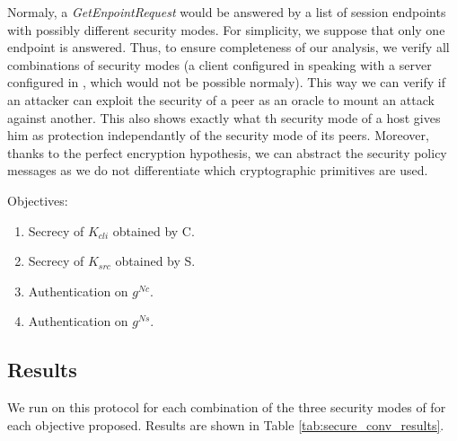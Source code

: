 Normaly, a {\em GetEnpointRequest} would be answered by a list of session
endpoints with possibly different security modes.
For simplicity, we suppose that only one endpoint is answered.
Thus, to ensure completeness of our analysis, we verify all combinations of
security modes (\eg a client configured in {\em \smn} speaking with a server
configured in {\em \smse}, which would not be possible normaly).
This way we can verify if an attacker can exploit the security of a peer as an
oracle to mount an attack against another.
This also shows exactly what th security mode of a host gives him as protection
independantly of the security mode of its peers.
Moreover, thanks to the perfect encryption hypothesis, we can abstract the
security policy messages as we do not differentiate which cryptographic
primitives are used.

Objectives:
\begin{enumerate}
    \item\label{item:sc_sec_cli} Secrecy of $K_{cli}$ obtained by C.
    \item\label{item:sc_sec_srv} Secrecy of $K_{src}$ obtained by S.
    \item\label{item:sc_auth_cli} Authentication on $g^{Nc}$.
    \item\label{item:sc_auth_srv} Authentication on $g^{Ns}$.
\end{enumerate}

\subsection{Results}

We run \proverif on this protocol for each combination of the three security
modes of \opcua for each objective proposed.
Results are shown in Table \ref{tab:secure_conv_results}.


